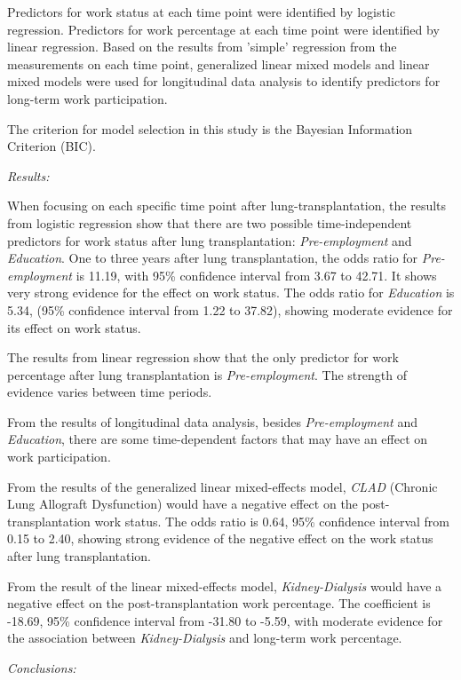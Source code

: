 \documentclass[11pt, a4paper]{article}\usepackage[]{graphicx}\usepackage[]{color}
\begin{document}
Predictors for work status at each time point were identified by logistic regression. Predictors for work percentage at each time point were identified by linear regression. Based on the results from 'simple' regression from the measurements on each time point, generalized linear mixed models and linear mixed models were used for longitudinal data analysis to identify predictors for long-term work participation.

The criterion for model selection in this study is the Bayesian Information Criterion (BIC).

\textit{Results:}

When focusing on each specific time point after lung-transplantation, the results from logistic regression show that there are two possible time-independent predictors for work status after lung transplantation: \textit{Pre-employment} and \textit{Education}. One to three years after lung transplantation, the odds ratio for \textit{Pre-employment} is 11.19, with 95\% confidence interval from 3.67 to 42.71. It shows very strong evidence for the effect on work status. The odds ratio for \textit{Education} is 5.34, (95\% confidence interval from 1.22 to 37.82), showing moderate evidence for its effect on work status.   

The results from linear regression show that the only predictor for work percentage after lung transplantation is \textit{Pre-employment}. The strength of evidence varies between time periods.


From the results of longitudinal data analysis, besides \textit{Pre-employment} and \textit{Education}, there are some time-dependent factors that may have an effect on work participation.

From the results of the generalized linear mixed-effects model, \textit{CLAD} (Chronic Lung Allograft Dysfunction) would have a negative effect on the post-transplantation work status. The odds ratio is 0.64, 95\% confidence interval from 0.15 to 2.40, showing strong evidence of the negative effect on the work status after lung transplantation.

From the result of the linear mixed-effects model, \textit{Kidney-Dialysis} would have a negative effect on the post-transplantation work percentage. The coefficient is -18.69, 95\% confidence interval  from -31.80 to -5.59, with moderate evidence for the association between \textit{Kidney-Dialysis} and long-term work percentage.


\textit{Conclusions:}
\end{document}
